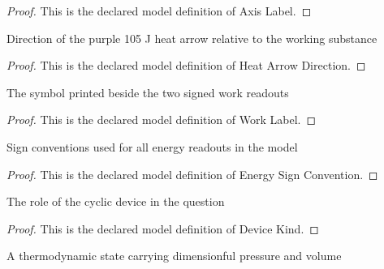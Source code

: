 \begin{proof}
  This is the declared model definition of Axis Label.
\end{proof}
\begin{definition}
  \label{def:physics:phyx-mini-0423:phyxminiproblems-problemphyxmini0423-heatarrowdirection}
  Direction of the purple 105 J heat arrow relative to the working substance
\end{definition}
\begin{proof}
  This is the declared model definition of Heat Arrow Direction.
\end{proof}
\begin{definition}
  \label{def:physics:phyx-mini-0423:phyxminiproblems-problemphyxmini0423-worklabel}
  The symbol printed beside the two signed work readouts
\end{definition}
\begin{proof}
  This is the declared model definition of Work Label.
\end{proof}
\begin{definition}
  \label{def:physics:phyx-mini-0423:phyxminiproblems-problemphyxmini0423-energysignconvention}
  Sign conventions used for all energy readouts in the model
\end{definition}
\begin{proof}
  This is the declared model definition of Energy Sign Convention.
\end{proof}
\begin{definition}
  \label{def:physics:phyx-mini-0423:phyxminiproblems-problemphyxmini0423-devicekind}
  The role of the cyclic device in the question
\end{definition}
\begin{proof}
  This is the declared model definition of Device Kind.
\end{proof}
\begin{definition}
  \label{def:physics:phyx-mini-0423:phyxminiproblems-problemphyxmini0423-thermodynamicstate}
  A thermodynamic state carrying dimensionful pressure and volume
\end{definition}
